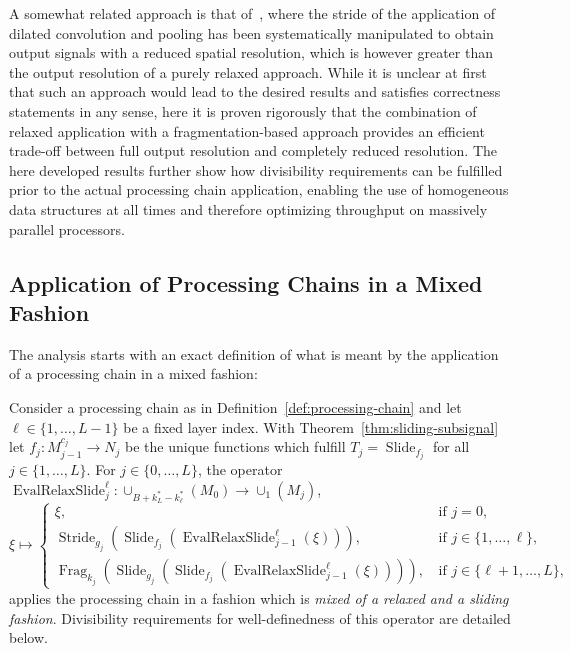\documentclass[journal]{IEEEtran}
\newcommand{\ROI}{B}
\newcommand{\discint}[2]{\{#1,\dotsc,#2\}}
\newcommand{\inint}[2]{\in\discint{#1}{#2}}
\DeclareMathOperator{\Slide}{Slide}
\DeclareMathOperator{\Stride}{Stride}
\DeclareMathOperator{\Fragmentation}{Frag}
\DeclareMathOperator{\EvalRelaxSlide}{EvalRelaxSlide}
\begin{document}
A somewhat related approach is that of~, where the stride of the application of dilated convolution and pooling has been systematically manipulated to obtain output signals with a reduced spatial resolution, which is however greater than the output resolution of a purely relaxed approach.
While it is unclear at first that such an approach would lead to the desired results and satisfies correctness statements in any sense, here it is proven rigorously that the combination of relaxed application with a fragmentation-based approach provides an efficient trade-off between full output resolution and completely reduced resolution.
The here developed results further show how divisibility requirements can be fulfilled prior to the actual processing chain application, enabling the use of homogeneous data structures at all times and therefore optimizing throughput on massively parallel processors.

\subsection{Application of Processing Chains in a Mixed Fashion}
The analysis starts with an exact definition of what is meant by the application of a processing chain in a mixed fashion:
\begin{definition}
\label{def:evalrelaxslide}
Consider a processing chain as in Definition~\ref{def:processing-chain} and let $\ell\inint{1}{L - 1}$ be a fixed layer index.
With Theorem~\ref{thm:sliding-subsignal} let $f_j\colon M_{j - 1}^{c_j}\to N_j$ be the unique functions which fulfill $T_j = \Slide_{f_j}$ for all $j\inint{1}{L}$.
For $j\inint{0}{L}$, the operator $\EvalRelaxSlide_j^\ell\colon\cup_{\ROI + k_L^* - k_\ell^*}(M_0)\to\cup_1(M_j)$, 
\begin{displaymath}
  \xi\mapsto
  \begin{cases}
    \xi\text{,} & \text{if } j = 0\text{,}\\
    \Stride_{g_j}(\Slide_{f_j}(\EvalRelaxSlide_{j - 1}^\ell(\xi)))\text{, } & \text{if } j\inint{1}{\ell}\text{,}\\
    \Fragmentation_{k_j}(\Slide_{g_j}(\Slide_{f_j}(\EvalRelaxSlide_{j - 1}^\ell(\xi))))\text{, } & \text{if } j\inint{\ell + 1}{L}\text{,}
  \end{cases}
\end{displaymath}
applies the processing chain in a fashion which is \emph{mixed of a relaxed and a sliding fashion}.
Divisibility requirements for well-definedness of this operator are detailed below.
\end{definition}
\end{document}
